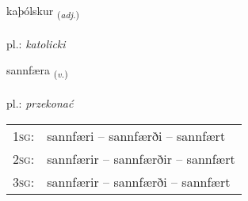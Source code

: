 \documentclass[frontgrid, backgrid]{flacards}\usepackage[]{graphicx}\usepackage[]{xcolor}
\begin{document}
\renewcommand{\flhead}{\vskip5pt \fboxsep=0pt {\small\bfseries\footnotesize Lýsingarorð | przymiotnik}}
\renewcommand{\fcfoot}{\vskip5pt \fboxsep=0pt \hspace{2pt}{\small\bfseries\footnotesize 3K}}

\renewcommand{\blhead}{\vskip5pt {\small\bfseries\footnotesize Lýsingarorð | przymiotnik }}
\renewcommand{\bcfoot}{\vskip5pt \hspace{2pt}{\small\bfseries\footnotesize 3K}}


{kaþólskur \small{\textsubscript{(\textit{adj.})}} \\[1ex] %
\textphonetic{[kʰaːθoulskʏr]} \\
pl.: \emph{katolicki} \\  [2ex]
\renewcommand*{\arraystretch}{0.8}
}

\renewcommand{\flhead}{\vskip5pt \fboxsep=0pt {\small\bfseries\footnotesize Sagnorð | czasownik}}
\renewcommand{\fcfoot}{\vskip5pt \fboxsep=0pt \hspace{2pt}{\small\bfseries\footnotesize 3K}}

\renewcommand{\blhead}{\vskip5pt {\small\bfseries\footnotesize Sagnorð | czasownik }}
\renewcommand{\bcfoot}{\vskip5pt \hspace{2pt}{\small\bfseries\footnotesize 3K}}


{sannfæra \small{\textsubscript{(\textit{v.})}} \\[1ex] %
\textphonetic{[sanfaira]} \\
pl.: \emph{przekonać} \\  [2ex]
\renewcommand*{\arraystretch}{0.8}
\begin{tabular}{p{1cm}l}
\textsc{1sg}: & sannfæri -- sannfærði -- sannfært \\ 
\textsc{2sg}: & sannfærir -- sannfærðir -- sannfært \\ 
\textsc{3sg}: & sannfærir -- sannfærði -- sannfært \\ 
\end{tabular}
}
\end{document}
